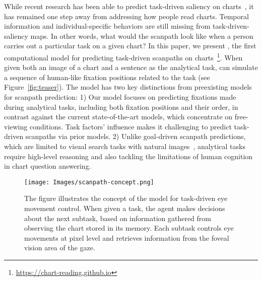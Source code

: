 While recent research has been able to predict task-driven saliency on charts~\cite{wang2024salchartqa}, it has remained one step away from addressing how people read charts. 
Temporal information and individual-specific behaviors are still missing from task-driven-saliency maps.
In other words, what would the scanpath look like when a person carries out a particular task on a given chart?
In this paper, we present \name, the first computational model for predicting task-driven scanpaths on charts~\footnote{\href{https://chart-reading.github.io}{https://chart-reading.github.io}}.
When given both an image of a chart and a sentence as the analytical task, \name can simulate a sequence of human-like fixation positions related to the task (see Figure~\ref{fig:teaser}).
The model has two key distinctions from preexisting models for scanpath prediction: 
1) Our model focuses on predicting fixations made during analytical tasks, including both fixation positions and their order, in contrast against the current state-of-the-art models, which concentrate on free-viewing conditions. Task factors' influence makes it challenging to predict task-driven scanpaths via prior models.
2) Unlike goal-driven scanpath predictions, which are limited to visual search tasks with natural images~\cite{mondal2023gazeformer}, analytical tasks require high-level reasoning and also tackling the limitations of human cognition in chart question answering.

\begin{figure*}[!t]
\centering
  \texttt{[image: Images/scanpath-concept.png]}
  \caption{The figure illustrates the concept of the model for task-driven eye movement control. When given a task, the agent makes decisions about the next subtask, based on information gathered from observing the chart stored in its memory. Each subtask controls eye movements at pixel level and retrieves information from the foveal vision area of the gaze.}
  \label{fig:concept}
\end{figure*}

